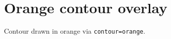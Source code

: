\documentclass{article}
\begin{document}
\section*{Orange contour overlay}

Contour drawn in orange via \texttt{contour=orange}.

\lipsum[1-5]
\end{document}
